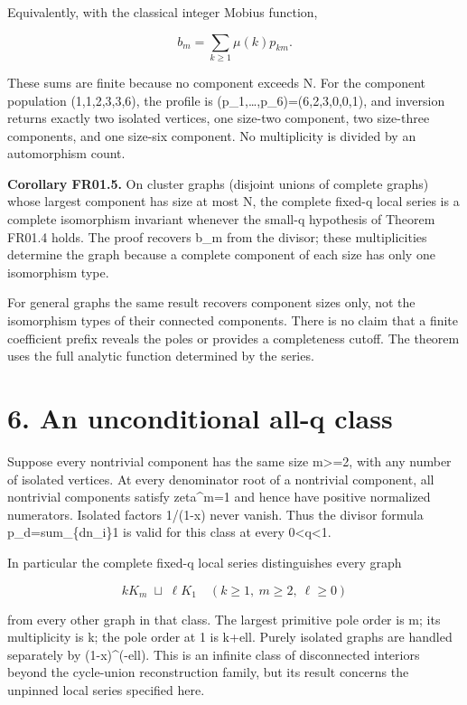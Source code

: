\documentclass[
  11pt,
  a4paper,
]{report}
\begin{document}
Equivalently, with the classical integer Mobius function,

\[
 b_m=\sum_{k\ge1}\mu(k)p_{km}.
\]

These sums are finite because no component exceeds N. For the component
population (1,1,2,3,3,6), the profile is
(p\_1,\ldots,p\_6)=(6,2,3,0,0,1), and inversion returns exactly two
isolated vertices, one size-two component, two size-three components,
and one size-six component. No multiplicity is divided by an
automorphism count.

\textbf{Corollary FR01.5.} On cluster graphs (disjoint unions of
complete graphs) whose largest component has size at most N, the
complete fixed-q local series is a complete isomorphism invariant
whenever the small-q hypothesis of Theorem FR01.4 holds. The proof
recovers b\_m from the divisor; these multiplicities determine the graph
because a complete component of each size has only one isomorphism type.

For general graphs the same result recovers component sizes only, not
the isomorphism types of their connected components. There is no claim
that a finite coefficient prefix reveals the poles or provides a
completeness cutoff. The theorem uses the full analytic function
determined by the series.

\hypertarget{an-unconditional-all-q-class}{%
\section{6. An unconditional all-q
class}\label{an-unconditional-all-q-class}}

Suppose every nontrivial component has the same size m\textgreater=2,
with any number of isolated vertices. At every denominator root of a
nontrivial component, all nontrivial components satisfy zeta\^{}m=1 and
hence have positive normalized numerators. Isolated factors 1/(1-x)
never vanish. Thus the divisor formula p\_d=sum\_\{d\textbar n\_i\}1 is
valid for this class at every 0\textless q\textless1.

In particular the complete fixed-q local series distinguishes every
graph

\[
 kK_m\;\sqcup\;\ell K_1
 \quad(k\ge1,\ m\ge2,\ \ell\ge0)
\]

from every other graph in that class. The largest primitive pole order
is m; its multiplicity is k; the pole order at 1 is k+ell. Purely
isolated graphs are handled separately by (1-x)\^{}(-ell). This is an
infinite class of disconnected interiors beyond the cycle-union
reconstruction family, but its result concerns the unpinned local series
specified here.
\end{document}

